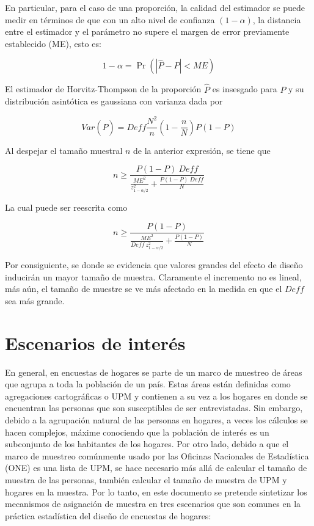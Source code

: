 \documentclass[
  10pt,
  spanish,
]{book}
\begin{document}
En particular, para el caso de una proporción, la calidad del estimador se puede medir en términos de que con un alto nivel de confianza \((1-\alpha)\), la distancia entre el estimador y el parámetro no supere el margen de error previamente establecido (ME), esto es:

\[
1-\alpha=\Pr\left(|\hat{P}-P|<ME\right)
\]

El estimador de Horvitz-Thompson de la proporción \(\hat{P}\) es insesgado para \(P\) y su distribución asintótica es gaussiana con varianza dada por

\[
Var\left(\hat{P}\right)=Deff\frac{N^2}{n}(1-\frac{n}{N})P(1-P)
\]

Al despejar el tamaño muestral \(n\) de la anterior expresión, se tiene que

\[
n\geq\frac{P(1-P) \ Deff}{\frac{ME^2}{z_{1-\alpha/2}^2}+\frac{P(1-P) \ Deff}{N}}
\]

La cual puede ser reescrita como

\[
n\geq\frac{P(1-P)}{\frac{ME^2}{Deff \ z_{1-\alpha/2}^2}+\frac{P(1-P)}{N}}
\]

Por consiguiente, se donde se evidencia que valores grandes del efecto de diseño inducirán un mayor tamaño de muestra. Claramente el incremento no es lineal, más aún, el tamaño de muestre se ve más afectado en la medida en que el \(Deff\) sea más grande.

\hypertarget{escenarios-de-interuxe9s}{%
\section{Escenarios de interés}\label{escenarios-de-interuxe9s}}

En general, en encuestas de hogares se parte de un marco de muestreo de áreas que agrupa a toda la población de un país. Estas áreas están definidas como agregaciones cartográficas o UPM y contienen a su vez a los hogares en donde se encuentran las personas que son susceptibles de ser entrevistadas. Sin embargo, debido a la agrupación natural de las personas en hogares, a veces los cálculos se hacen complejos, máxime conociendo que la población de interés es un subconjunto de los habitantes de los hogares. Por otro lado, debido a que el marco de muestreo comúnmente usado por las Oficinas Nacionales de Estadística (ONE) es una lista de UPM, se hace necesario más allá de calcular el tamaño de muestra de las personas, también calcular el tamaño de muestra de UPM y hogares en la muestra. Por lo tanto, en este documento se pretende sintetizar los mecanismos de asignación de muestra en tres escenarios que son comunes en la práctica estadística del diseño de encuestas de hogares:
\end{document}
